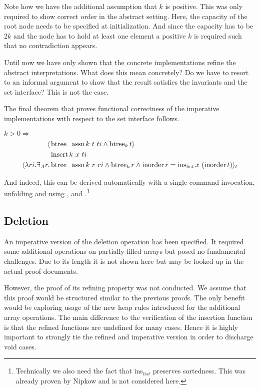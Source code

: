 Note how we have the additional assumption that $k$ is positive.
This was only required to show correct order in the abstract setting.
Here, the capacity of the root node needs to be specified at initialization.
And since the capacity has to be $2k$ and the node has to hold at least one element
a positive $k$ is required such that no contradiction appears.

Until now we have only shown that the concrete
implementations refine the abstract interpretations.
What does this mean concretely?
Do we have to resort to an informal argument to show that the result
satisfies the invariants and the set interface?
This is not the case.

The final theorem that proves functional correctness of the imperative
implementations with respect to the set interface follows.

\begin{corollary} $k > 0 \Longrightarrow$
\begin{align*}
   \langle &\operatorname{btree\_assn} k\ t\ ti \wedge \operatorname{btree}_k t \rangle \\
           &\operatorname{insert} k\ x\ ti \\
   \langle \lambda ri. \exists_A r. &\operatorname{btree\_assn} k\ r\ ri \wedge \operatorname{btree}_k r \wedge \operatorname{inorder} r = \operatorname{ins_{list}} x\ (\operatorname{inorder} t)\rangle_t
\end{align*}
\end{corollary}

And indeed, this can be derived automatically with a single command invocation,
unfolding  and using ,  and .\footnote{
    Technically we also need the fact that ins$_{list}$ preserves sortedness.
    This was already proven by Nipkow \parencite{DBLP:conf/itp/Nipkow16}
    and is not considered here.
}


\subsection{Deletion}

An imperative version of the deletion operation has been specified.
It required some additional operations on partially filled arrays but
posed no fundamental challenges.
Due to its length it is not shown here but may be looked up in the
actual proof documents.

However, the proof of its refining property was not conducted.
We assume that this proof would be structured similar to
the previous proofs.
The only benefit would be exploring usage of the new
heap rules introduced for the additional array operations.
The main difference to the verification of the
insertion function is that the refined functions
are undefined for many cases.
Hence it is highly important
to strongly tie the refined and imperative version
in order to discharge void cases.